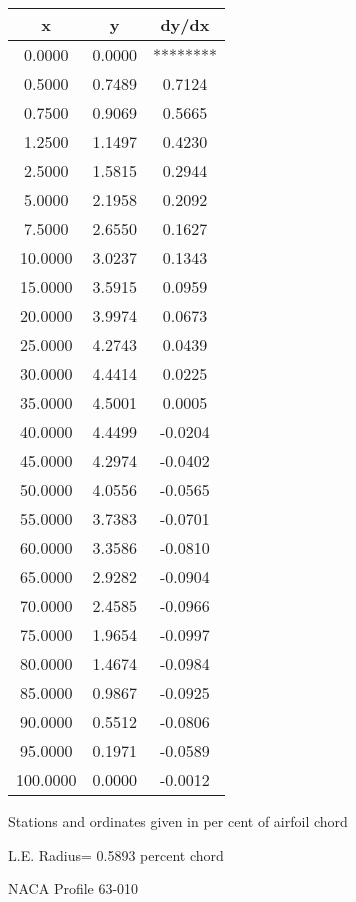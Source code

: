 \documentclass[11pt]{book}
\begin{document}
 \vspace{8mm}
 \begin{tabular}{|c|c|c|} \hline 
  x  &  y  &  dy/dx \\
 \hline
0.0000 & 0.0000 & ******** \\
0.5000 & 0.7489 & 0.7124 \\
0.7500 & 0.9069 & 0.5665 \\
1.2500 & 1.1497 & 0.4230 \\
2.5000 & 1.5815 & 0.2944 \\
5.0000 & 2.1958 & 0.2092 \\
7.5000 & 2.6550 & 0.1627 \\
10.0000 & 3.0237 & 0.1343 \\
15.0000 & 3.5915 & 0.0959 \\
20.0000 & 3.9974 & 0.0673 \\
25.0000 & 4.2743 & 0.0439 \\
30.0000 & 4.4414 & 0.0225 \\
35.0000 & 4.5001 & 0.0005 \\
40.0000 & 4.4499 & -0.0204 \\
45.0000 & 4.2974 & -0.0402 \\
50.0000 & 4.0556 & -0.0565 \\
55.0000 & 3.7383 & -0.0701 \\
60.0000 & 3.3586 & -0.0810 \\
65.0000 & 2.9282 & -0.0904 \\
70.0000 & 2.4585 & -0.0966 \\
75.0000 & 1.9654 & -0.0997 \\
80.0000 & 1.4674 & -0.0984 \\
85.0000 & 0.9867 & -0.0925 \\
90.0000 & 0.5512 & -0.0806 \\
95.0000 & 0.1971 & -0.0589 \\
100.0000 & 0.0000 & -0.0012 \\
 \hline
 \end{tabular}
 \vspace{8mm}


Stations and ordinates given in per cent of airfoil chord 


L.E. Radius=  0.5893 percent chord
 \newpage
  \label{p63-010}
 \begin{Large}
 NACA Profile 63-010
 \end{Large}
  
\end{document}
